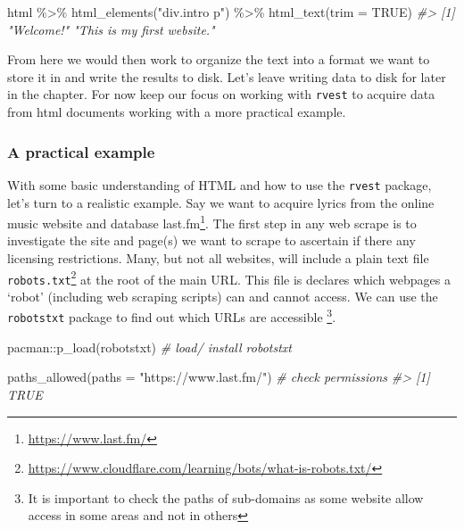 \documentclass[
]{article}
\newenvironment{Shaded}{\begin{snugshade}}{\end{snugshade}}
\newcommand{\AttributeTok}[1]{\textcolor[rgb]{0.77,0.63,0.00}{#1}}
\newcommand{\CommentTok}[1]{\textcolor[rgb]{0.56,0.35,0.01}{\textit{#1}}}
\newcommand{\ConstantTok}[1]{\textcolor[rgb]{0.00,0.00,0.00}{#1}}
\newcommand{\FunctionTok}[1]{\textcolor[rgb]{0.00,0.00,0.00}{#1}}
\newcommand{\NormalTok}[1]{#1}
\newcommand{\SpecialCharTok}[1]{\textcolor[rgb]{0.00,0.00,0.00}{#1}}
\newcommand{\StringTok}[1]{\textcolor[rgb]{0.31,0.60,0.02}{#1}}
\DeclareRobustCommand{\href}[2]{#2\footnote{\url{#1}}}
\begin{document}
\begin{Shaded}
\begin{Highlighting}[]
\NormalTok{html }\SpecialCharTok{\%\textgreater{}\%}
    \FunctionTok{html\_elements}\NormalTok{(}\StringTok{"div.intro p"}\NormalTok{) }\SpecialCharTok{\%\textgreater{}\%}
    \FunctionTok{html\_text}\NormalTok{(}\AttributeTok{trim =} \ConstantTok{TRUE}\NormalTok{)}
\CommentTok{\#\textgreater{} [1] "Welcome!"                  "This is my first website."}
\end{Highlighting}
\end{Shaded}

From here we would then work to organize the text into a format we want to store it in and write the results to disk. Let's leave writing data to disk for later in the chapter. For now keep our focus on working with \texttt{rvest} to acquire data from html documents working with a more practical example.

\hypertarget{a-practical-example}{%
\subsubsection{A practical example}\label{a-practical-example}}

With some basic understanding of HTML and how to use the \texttt{rvest} package, let's turn to a realistic example. Say we want to acquire lyrics from the online music website and database \href{https://www.last.fm/}{last.fm}. The first step in any web scrape is to investigate the site and page(s) we want to scrape to ascertain if there any licensing restrictions. Many, but not all websites, will include a plain text file \href{https://www.cloudflare.com/learning/bots/what-is-robots.txt/}{\texttt{robots.txt}} at the root of the main URL. This file is declares which webpages a `robot' (including web scraping scripts) can and cannot access. We can use the \texttt{robotstxt} package to find out which URLs are accessible \footnote{It is important to check the paths of sub-domains as some website allow access in some areas and not in others}.

\begin{Shaded}
\begin{Highlighting}[]
\NormalTok{pacman}\SpecialCharTok{::}\FunctionTok{p\_load}\NormalTok{(robotstxt)  }\CommentTok{\# load/ install \textasciigrave{}robotstxt\textasciigrave{}}

\FunctionTok{paths\_allowed}\NormalTok{(}\AttributeTok{paths =} \StringTok{"https://www.last.fm/"}\NormalTok{)  }\CommentTok{\# check permissions}
\CommentTok{\#\textgreater{} [1] TRUE}
\end{Highlighting}
\end{Shaded}
\end{document}
